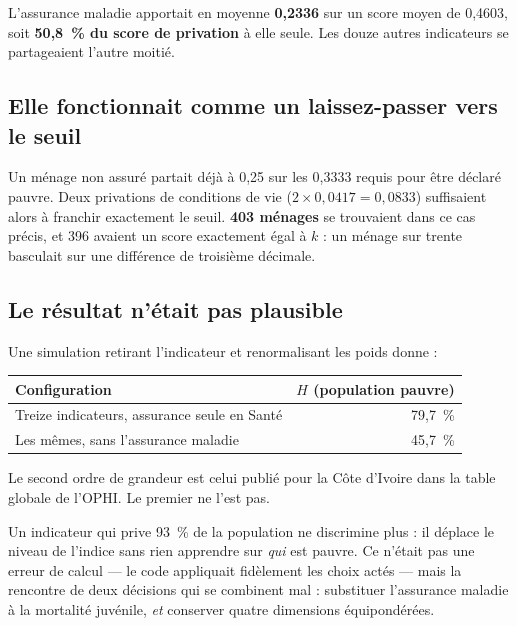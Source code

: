 \documentclass[11pt,a4paper]{article}
\begin{document}
L'assurance maladie apportait en moyenne \textbf{0,2336} sur un score moyen de 0,4603, soit
\textbf{50,8~\% du score de privation} à elle seule. Les douze autres indicateurs se partageaient
l'autre moitié.

\subsection{Elle fonctionnait comme un laissez-passer vers le seuil}

Un ménage non assuré partait déjà à 0,25 sur les 0,3333 requis pour être déclaré pauvre. Deux
privations de conditions de vie ($2 \times 0{,}0417 = 0{,}0833$) suffisaient alors à franchir
exactement le seuil. \textbf{403 ménages} se trouvaient dans ce cas précis, et 396 avaient un
score exactement égal à $k$ : un ménage sur trente basculait sur une différence de troisième
décimale.

\subsection{Le résultat n'était pas plausible}

Une simulation retirant l'indicateur et renormalisant les poids donne :

\begin{center}
\begin{tabular}{@{}lr@{}}
\toprule
\textbf{Configuration} & \textbf{$H$ (population pauvre)} \\
\midrule
Treize indicateurs, assurance seule en Santé & 79,7~\% \\
Les mêmes, sans l'assurance maladie & 45,7~\% \\
\bottomrule
\end{tabular}
\end{center}

Le second ordre de grandeur est celui publié pour la Côte d'Ivoire dans la table globale de
l'OPHI. Le premier ne l'est pas.

\begin{retenir}
Un indicateur qui prive 93~\% de la population ne discrimine plus : il déplace le niveau de
l'indice sans rien apprendre sur \emph{qui} est pauvre. Ce n'était pas une erreur de calcul --- le
code appliquait fidèlement les choix actés --- mais la rencontre de deux décisions qui se
combinent mal : substituer l'assurance maladie à la mortalité juvénile, \emph{et} conserver quatre
dimensions équipondérées.
\end{retenir}
\end{document}
